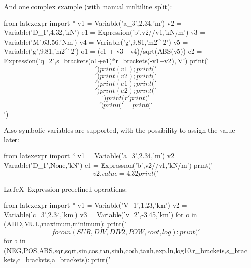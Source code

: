 \documentclass{report}
\begin{document}
And one complex example (with manual multiline split):
\begin{python}
	from latexexpr import *
	v1 = Variable('a_3',2.34,'m')
	v2 = Variable('D_1',4.32,'kN')
	e1 = Expression('b',v2//v1,'kN/m')
	v3 = Variable('M',63.56,'Nm')
	v4 = Variable('g',9.81,'m2^{-2}')
	v5 = Variable('g',9.81,'m2^{-2}')
	o1 = (e1 + v3 - v4)/sqrt(ABS(v5))
	e2 = Expression('q_2',s_brackets(o1+e1)*r_brackets(-v1+v2),'V')
	print('$$')
	print(v1); print('$$\n$$')
	print(v2); print('$$\n$$')
	print(e1); print('$$\n$$')
	print(e2); print('$$\n$$')
	print(r'%
	print('$$\n$$')
	print('= %
	print('$$')
\end{python}

Also symbolic variables are supported,
with the possibility to assign the value later:
\begin{python}
	from latexexpr import *
	v1 = Variable('a_3',2.34,'m')
	v2 = Variable('D_1',None,'kN')
	e1 = Expression('b',v2//v1,'kN/m')
	print('$$ %
	v2.value = 4.32
	print('$$ %
\end{python}


\LaTeX\ Expression predefined operations:
\begin{python}
	from latexexpr import *
	v1 = Variable('V_1',1.23,'km')
	v2 = Variable('c_3',2.34,'km')
	v3 = Variable('v_2',-3.45,'km')
	for o in (ADD,MUL,maximum,minimum):
	   print('$$ %
	for o in (SUB,DIV,DIV2,POW,root,log):
	   print('$$ %
	for o in (NEG,POS,ABS,sqr,sqrt,sin,cos,tan,sinh,cosh,tanh,exp,ln,log10,r_brackets,s_brackets,c_brackets,a_brackets):
	   print('$$ %
\end{python}
\end{document}
